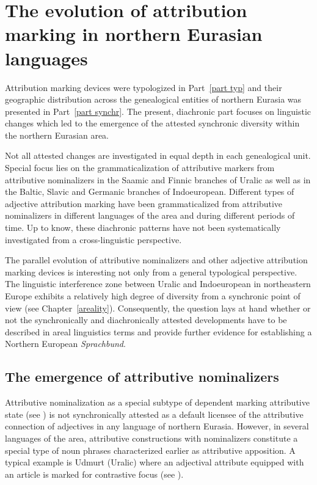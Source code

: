 
\chapter[The evolution of attribution marking]{The evolution of attribution marking in northern Eurasian languages}
Attribution marking devices were typologized in Part~\ref{part typ} and their geographic distribution across the genealogical entities of northern Eurasia was presented in Part~\ref{part synchr}. The present, diachronic part focuses on linguistic changes which led to the emergence of the attested synchronic diversity within the northern Eurasian area.

Not all attested changes are investigated in equal depth in each genealogical unit. Special focus lies on the grammaticalization of attributive markers from attributive nominalizers in the Saamic and Finnic branches of Uralic as well as in the Baltic, Slavic and Germanic branches of Indoeuropean. Different types of adjective attribution marking have been grammaticalized from attributive nominalizers in different languages of the area and during different periods of time. Up to know, these diachronic patterns have not been systematically investigated from a cross-linguistic perspective.

The parallel evolution of attributive nominalizers and other adjective attribution marking devices is interesting not only from a general typological perspective. The linguistic interference zone between Uralic and Indoeuropean in northeastern Europe exhibits a relatively high degree of diversity from a synchronic point of view (see Chapter~\ref{areality}). Consequently, the question lays at hand whether or not the synchronically and diachronically attested developments have to be described in areal linguistics terms and provide further evidence for establishing a Northern European \textit{Sprachbund}.

\section[Attributive nominalizers]{The emergence of attributive nominalizers}
Attributive nominalization as a special subtype of dependent marking attributive state (see ) is not synchronically attested as a default licensee of the attributive connection of adjectives in any language of northern Eurasia. However, in several languages of the area, attributive constructions with nominalizers constitute a special type of noun phrases characterized earlier as attributive apposition. A typical example is Udmurt (Uralic) where an adjectival attribute equipped with an article is marked for contrastive focus (see ).

